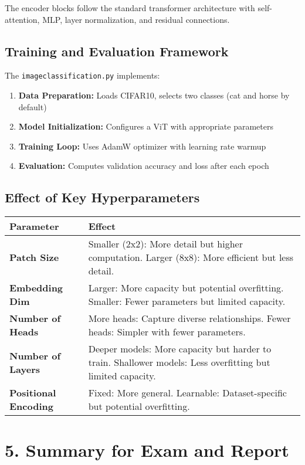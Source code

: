 The encoder blocks follow the standard transformer architecture with self-attention, MLP, layer normalization, and residual connections.

\subsection*{Training and Evaluation Framework}

The \texttt{imageclassification.py} implements:

\begin{enumerate}
    \item \textbf{Data Preparation:} Loads CIFAR10, selects two classes (cat and horse by default)
    \item \textbf{Model Initialization:} Configures a ViT with appropriate parameters
    \item \textbf{Training Loop:} Uses AdamW optimizer with learning rate warmup
    \item \textbf{Evaluation:} Computes validation accuracy and loss after each epoch
\end{enumerate}

\subsection*{Effect of Key Hyperparameters}

\begin{tabular}{|l|p{10cm}|}
\hline
\textbf{Parameter} & \textbf{Effect} \\
\hline
\textbf{Patch Size} & Smaller (2x2): More detail but higher computation. Larger (8x8): More efficient but less detail. \\
\hline
\textbf{Embedding Dim} & Larger: More capacity but potential overfitting. Smaller: Fewer parameters but limited capacity. \\
\hline
\textbf{Number of Heads} & More heads: Capture diverse relationships. Fewer heads: Simpler with fewer parameters. \\
\hline
\textbf{Number of Layers} & Deeper models: More capacity but harder to train. Shallower models: Less overfitting but limited capacity. \\
\hline
\textbf{Positional Encoding} & Fixed: More general. Learnable: Dataset-specific but potential overfitting. \\
\hline
\end{tabular}
\section*{5. Summary for Exam and Report}

